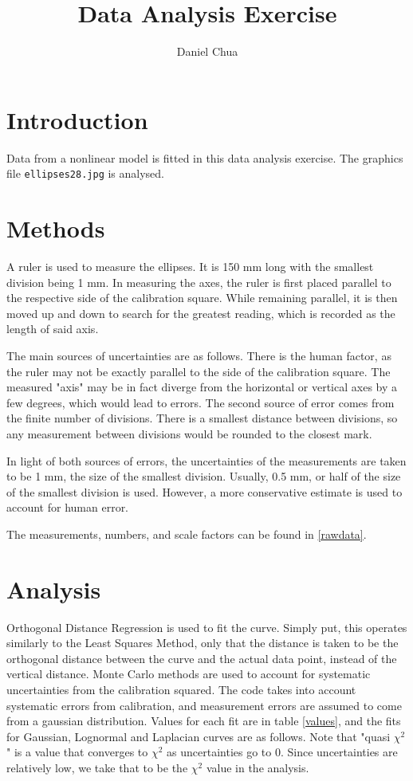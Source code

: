 \documentclass[12pt]{article}
\author{Daniel Chua}
\title{Data Analysis Exercise}
\begin{document}
\maketitle

\section{Introduction}

Data from a nonlinear model is fitted in this data analysis exercise. The graphics file \verb|ellipses28.jpg| is analysed.

\section{Methods}

A ruler is used to measure the ellipses. It is 150 mm long with the smallest division being 1 mm. In measuring the axes, the ruler is first placed parallel to the respective side of the calibration square. While remaining parallel, it is then moved up and down to search for the greatest reading, which is recorded as the length of said axis.

The main sources of uncertainties are as follows. There is the human factor, as the ruler may not be exactly parallel to the side of the calibration square. The measured "axis" may be in fact diverge from the horizontal or vertical axes by a few degrees, which would lead to errors. The second source of error comes from the finite number of divisions. There is a smallest distance between divisions, so any measurement between divisions would be rounded to the closest mark.

In light of both sources of errors, the uncertainties of the measurements are taken to be 1 mm, the size of the smallest division. Usually, 0.5 mm, or half of the size of the smallest division is used. However, a more conservative estimate is used to account for human error.

The measurements, numbers, and scale factors can be found in \ref{rawdata}.

\section{Analysis}

Orthogonal Distance Regression is used to fit the curve. Simply put, this operates similarly to the Least Squares Method, only that the distance is taken to be the orthogonal distance between the curve and the actual data point, instead of the vertical distance. Monte Carlo methods are used to account for systematic uncertainties from the calibration squared. The code takes into account systematic errors from calibration, and measurement errors are assumed to come from a gaussian distribution. Values for each fit are in table \ref{values}, and the fits for Gaussian, Lognormal and Laplacian curves are as follows. Note that "quasi $\chi^2$" is a value that converges to $\chi^2$ as uncertainties go to 0. Since uncertainties are relatively low, we take that to be the $\chi^2$ value in the analysis.
\end{document}

